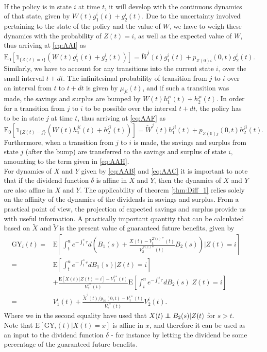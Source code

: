 \documentclass[12pt]{article}
\newcommand{\E}{\text{E}}
\newcommand{\indic}[1]{\mathds{1}_{ \{ #1 \} }}
\newcommand\independent{\protect\mathpalette{\protect\independenT}{\perp}}
\def\independenT#1#2{\mathrel{\rlap{$#1#2$}\mkern2mu{#1#2}}}
\theoremstyle{my_thm}
\begin{document}
\\[12pt]
If the policy is in state $i$ at time $t$, it will develop with the continuous dynamics of that state, given by $W(t)g^i_1(t)+g_2^i(t)$. Due to the uncertainty involved pertaining to the state of the policy and the value of $W$, we have to weigh these dynamics with the probability of $Z(t)=i$, as well as the expected value of $W$, thus arriving at \eqref{eq:AAI} as
$$
\E_0 [\indic{Z(t)=i} \left(W(t)g^i_1(t)+g_2^i(t)\right)]= \tilde{W}^i(t)g_1^i(t)+p_{Z(0)i}(0,t)g_2^i(t).
$$
Similarly, we have to account for any transitions into the current state $i$, over the small interval $t+dt$. The infinitesimal probability of transition from $j$ to $i$ over an interval from $t$ to $t+dt$ is given by $\mu_{ji}(t)$, and if such a transition was made, the savings and surplus are bumped by $W(t)h^{ji}_1(t)+h^{ji}_2(t)$. In order for a transition from $j$ to $i$ to be possible over the interval $t+dt$, the policy has to be in state $j$ at time $t$, thus arriving at 
\eqref{eq:AAF} as
$$
\E_0[ \indic{Z(t)=j} \left( W(t)h_1^{ji}(t)+ h_2^{ji}(t)\right)]=\tilde{W}^j(t) h_1^{ji}(t)+ p_{Z(0)j}(0,t)h_2^{ji}(t).
$$
Furthermore, when a transition from $j$ to $i$ is made, the savings and surplus from state $j$ (after the bump) are transferred to the savings and surplus of state $i$, amounting to the term given in \eqref{eq:AAH}. 
\\[12pt]
For dynamics of $X$ and $Y$ given by \eqref{eq:AAB} and \eqref{eq:AAC} it is important to note that if the dividend function $\delta$ is affine in $X$ and $Y$, then the dynamics of $X$ and $Y$ are also affine in $X$ and $Y$. The applicability of theorem \ref{thm:Diff_1} relies solely on the affinity of the dynamics of the dividends in savings and surplus. From a practical point of view, the projection of expected savings and surplus provide us with useful information. A practically important quantity that can be calculated based on $\tilde{X}$ and $\tilde{Y}$ is the present value of guaranteed future benefits, given by
\begin{align*}
\text{GY}_i(t)=&\E \left[ \int_t^n e^{-\int_t^s r} d \left( B_1(s)+\frac{X(t)-V_1^{Z(t)*}(t)}{V_2^{Z(t)*}(t)}B_2(s) \right) \big|Z(t)=i\right]
\\
=&
\E \left[ \int_t^n e^{-\int_t^s r} d B_1(s) \big| Z(t)=i \right]
\\
&+ \frac{\E[X(t)|Z(t)=i]-V_1^{i*}(t)}{V_2^{i*}(t)}  \E \left[ \int_t^n e^{-\int_t^s r} dB_2(s) \big|Z(t)=i\right]
\\
=&
V_1^i(t)+\frac{\tilde{X}^{i}(t)/p_{0i}(0,t)-V_1^{i*}(t)}{V_2^{i*}(t)}V_2^i(t).
\end{align*}
Where we in the second equality have used that $X(t)\independent B_2(s)|Z(t)$ for $s>t$. Note that $\E[\text{GY}_i(t)|X(t)=x]$ is affine in $x$, and therefore it can be used as an input to the dividend function $\delta$ - for instance by letting the dividend be some percentage of the guaranteed future benefits.
\end{document}
